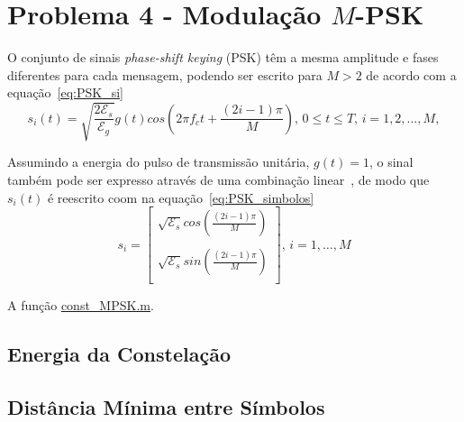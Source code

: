 \section{Problema 4 - Modulação \texorpdfstring{$M$}{M}-PSK}

O conjunto de sinais \textit{phase-shift keying} (PSK) têm a mesma amplitude e fases diferentes para cada mensagem, podendo ser escrito para $M > 2$ de acordo com a equação~\ref{eq:PSK_si}
\begin{equation}
    s_i(t) = \sqrt{\frac{2\mathcal{E}_s}{\mathcal{E}_g}} g(t) cos(2\pi f_c t + \frac{(2i-1)\pi}{M}), \, 0 \leq t \leq T, \, i = 1,2,\dots,M,
    \label{eq:PSK_si}
\end{equation}

Assumindo a energia do pulso de transmissão unitária, $g(t) = 1$, o sinal também pode ser expresso através de uma combinação linear~\cite{Cecilio}, de modo que $s_i(t)$ é reescrito coom na equação~\ref{eq:PSK_simbolos}
\begin{equation}
    s_i =   \begin{bmatrix}
                \sqrt{\mathcal{E}_s} cos(\frac{(2i-1)\pi}{M}) \\
                \\ 
                \sqrt{\mathcal{E}_s} sin(\frac{(2i-1)\pi}{M}) \\ 
            \end{bmatrix}, \, i = 1,\dots,M
    \label{eq:PSK_simbolos}
\end{equation}

A função \href{https://raw.githubusercontent.com/lucasabdalah/Courses-HWs/SCD/Sistemas%20de%20Comunicacoes%20Digitais/matlab/problema4/parte1/const_MPSK.m}{const\_MPSK.m}.


\subsection{Energia da Constelação} 

\subsection{Distância Mínima entre Símbolos}


